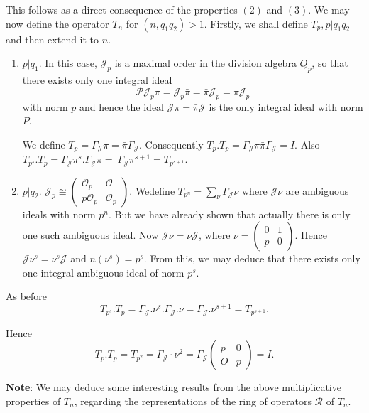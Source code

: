 This follows as a direct consequence of the properties $(2)$ and
$(3)$. We may now define the operator $T_n$ for $(n, q_1 q_2) >
1$. Firstly, we shall define $T_p, p| q_1 q_2$ and then extend it to
$n$. 
\begin{enumerate} [1.]
\item $\underline{p | q_1}$. In this case, $\mathcal{J}_p$ is a
  maximal order in the division algebra $Q_p$, so that there exists
  only one integral ideal 
  $$
  \mathscr{P} \mathcal{J}_p \pi = \mathcal{J}_p \bar{\pi} = \bar{\pi}
  \mathcal{J}_{p} = \pi \mathcal{J}_{p} 
  $$
  with norm $p$ and hence the ideal $\mathcal{J} \pi = \bar{\pi}
  \mathcal{J} $ is the only integral ideal with norm $P$. 
  
  We define $T_p = \Gamma_{\mathcal{J}} \pi = \bar{\pi}
  \Gamma_\mathcal{J}$. Consequently $T_p. T_p = \Gamma_\mathcal{J} \pi
  \bar{\pi} \Gamma_\mathcal{J} = I$. Also $T_{p^s}. T_p =
  \Gamma_{\mathcal{J}} \pi^s.  \Gamma_{\mathcal{J}} \pi = ~
  \Gamma_{\mathcal{J}} \pi^{s+1} =  T_{p^{s+1}}$. 
\item $\underline{p \big | q_2}$. $\mathcal{J}_p \cong \begin{pmatrix}
  \mathscr{O}_p & \mathscr{O} \\ p \mathscr{O}_p &
  \mathscr{O}_p \end{pmatrix}$.  We\pageoriginale define $T_{p^n} =
  \sum\limits_{\nu} \Gamma_\mathcal{J} \nu$ where $\mathcal{J} \nu$
  are ambiguous ideals with norm $p^n$. But we have already shown that
  actually there is only one such ambiguous ideal. Now $\mathcal{J}
  \nu = \nu \mathcal{J}$, where $ \nu = \begin{pmatrix} 0 & 1 \\ p &
    0 \end{pmatrix}$. Hence $\mathcal{J} \nu^s = \nu^s \mathcal{J}$
  and $n (\nu^s) = p^s$. From this, we may deduce that there exists
  only one integral ambiguous ideal of norm $p^s$. 
\end{enumerate}

As before
$$
T_{p^s}. T_p = \Gamma_\mathcal{J}.  \nu^s.  \Gamma_\mathcal{J}.  \nu =
\Gamma_\mathcal{J}.  \nu^{s+1} = T_{p^{s+1}}. 
$$

Hence
$$
T_p. T_p = T_{p^2} = \Gamma_{\mathcal{J}} \cdot \nu^2 =
\Gamma_\mathcal{J} \begin{pmatrix} p & 0 \\ O & p \end{pmatrix} = I. 
$$

\noindent \textbf{Note}: We may deduce some interesting results from the above
multiplicative properties of $T_n$, regarding the representations of
the ring of operators $\mathscr{R}$ of $T_n$. 

